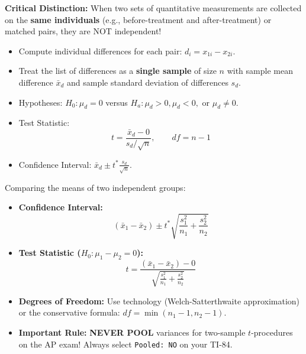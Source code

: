 \begin{lessonbox}
\textbf{Critical Distinction:} When two sets of quantitative measurements are collected on the \textbf{same individuals} (e.g., before-treatment and after-treatment) or matched pairs, they are NOT independent!
\begin{itemize}[leftmargin=1.2em]
  \item Compute individual differences for each pair: $d_i = x_{1i} - x_{2i}$.
  \item Treat the list of differences as a \textbf{single sample} of size $n$ with sample mean difference $\bar{x}_d$ and sample standard deviation of differences $s_d$.
  \item Hypotheses: $H_0: \mu_d = 0$ versus $H_a: \mu_d > 0, \mu_d < 0,$ or $\mu_d \neq 0$.
  \item Test Statistic:
  \begin{equation}
    t = \frac{\bar{x}_d - 0}{s_d / \sqrt{n}}, \qquad df = n - 1
  \end{equation}
  \item Confidence Interval: $\bar{x}_d \pm t^* \frac{s_d}{\sqrt{n}}$.
\end{itemize}
\end{lessonbox}

\begin{lessonbox}
Comparing the means of two independent groups:
\begin{itemize}[leftmargin=1.2em]
  \item \textbf{Confidence Interval:}
  \begin{equation}
    (\bar{x}_1 - \bar{x}_2) \pm t^* \sqrt{\frac{s_1^2}{n_1} + \frac{s_2^2}{n_2}}
  \end{equation}
  \item \textbf{Test Statistic ($H_0: \mu_1 - \mu_2 = 0$):}
  \begin{equation}
    t = \frac{(\bar{x}_1 - \bar{x}_2) - 0}{\sqrt{\frac{s_1^2}{n_1} + \frac{s_2^2}{n_2}}}
  \end{equation}
  \item \textbf{Degrees of Freedom:} Use technology (Welch-Satterthwaite approximation) or the conservative formula: $df = \min(n_1 - 1, n_2 - 1)$.
  \item \textbf{Important Rule:} \textbf{NEVER POOL} variances for two-sample $t$-procedures on the AP exam! Always select \texttt{Pooled: NO} on your TI-84.
\end{itemize}
\end{lessonbox}

